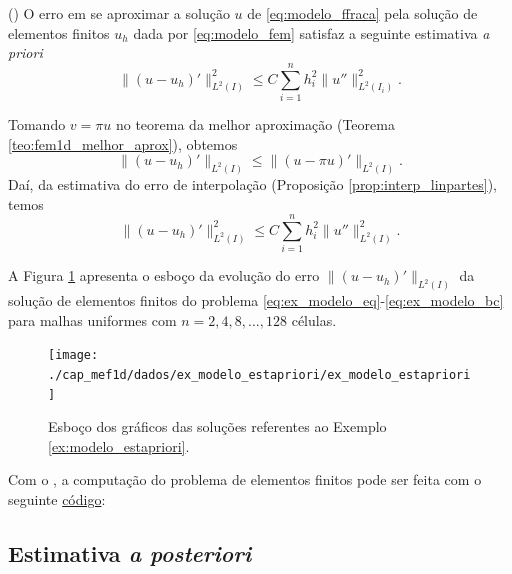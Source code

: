 \begin{teo}()
  O erro em se aproximar a solução $u$ de \eqref{eq:modelo_ffraca} pela solução de elementos finitos $u_h$ dada por \eqref{eq:modelo_fem} satisfaz a seguinte estimativa {\it a priori}
\begin{equation}
  \|(u-u_h)'\|_{L^2(I)}^2 \leq C\sum_{i=1}^n h_i^2\|u''\|_{L^2(I_i)}^2.
\end{equation}
\end{teo}
\begin{dem}
  Tomando $v = \pi u$ no teorema da melhor aproximação (Teorema \ref{teo:fem1d_melhor_aprox}), obtemos
  \begin{equation}
    \|(u-u_h)'\|_{L^2(I)} \leq \|(u-\pi u)'\|_{L^2(I)}.
  \end{equation}
Daí, da estimativa do erro de interpolação (Proposição \ref{prop:interp_linpartes}), temos
\begin{equation}
  \|(u-u_h)'\|_{L^2(I)}^2 \leq C\sum_{i=1}^n h_i^2\|u''\|_{L^2(I)}^2.
\end{equation}
\end{dem}

\begin{ex}\label{ex:modelo_estapriori}
  A Figura \ref{fig:ex_modelo_estapriori} apresenta o esboço da evolução do erro $\|(u - u_h)'\|_{L^2(I)}$ da solução de elementos finitos do problema \eqref{eq:ex_modelo_eq}-\eqref{eq:ex_modelo_bc} para malhas uniformes com $n=2, 4, 8, \ldots, 128$ células.

\begin{figure}[h!]
  \centering
  \texttt{[image: ./cap\_mef1d/dados/ex\_modelo\_estapriori/ex\_modelo\_estapriori]}
  \caption{Esboço dos gráficos das soluções referentes ao Exemplo \ref{ex:modelo_estapriori}.}
  \label{fig:ex_modelo_estapriori}
\end{figure}

\ifispython
Com o \fenics, a computação do problema de elementos finitos pode ser feita com o seguinte \href{https://github.com/phkonzen/notas/blob/master/src/MetodoElementosFinitos/cap_mef1d/dados/ex_modelo_estapriori/ex_modelo_estapriori.py}{código}:

\fi
\end{ex}

\subsection{Estimativa {\it a posteriori}}

